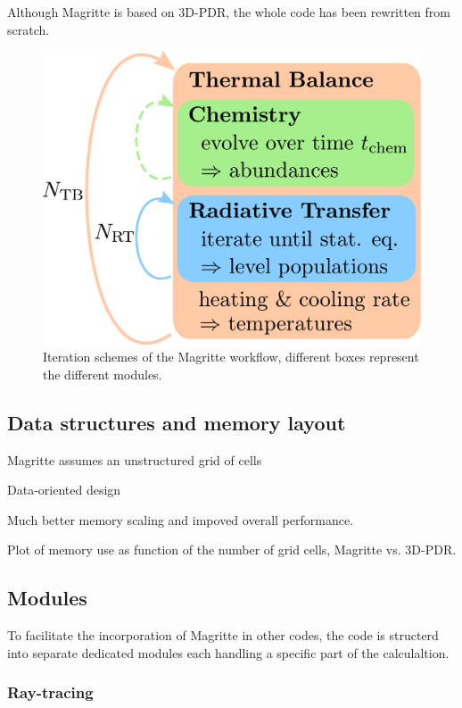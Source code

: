 \documentclass[a4paper,fleqn,usenatbib]{mnras}
\begin{document}
Although Magritte is based on 3D-PDR, the whole code has been rewritten from scratch.


\begin{figure}
	\centering
	\includegraphics[width=.9\columnwidth]{figures/scheme.pdf}
  \caption{Iteration schemes of the Magritte workflow, different boxes represent the different modules.}
  \label{scheme}
\end{figure}



\subsection{Data structures and memory layout}

Magritte assumes an unstructured grid of cells

Data-oriented design


Much better memory scaling and impoved overall performance.

Plot of memory use as function of the number of grid cells, Magritte vs. 3D-PDR.


\subsection{Modules}

To facilitate the incorporation of Magritte in other codes, the code is structerd into separate dedicated modules each handling a specific part of the calculaltion.

\subsubsection{Ray-tracing}
\end{document}
